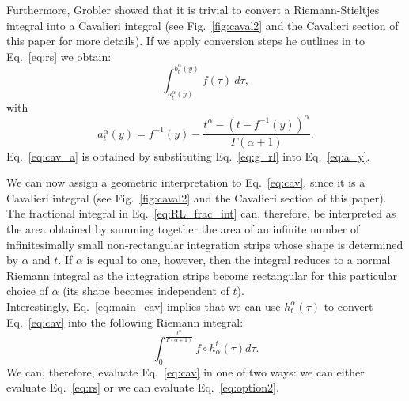 \documentclass{article}
\theoremstyle{theorem}
\theoremstyle{definition}
\begin{document}
\noindent
Furthermore, Grobler showed that it is trivial to convert a Riemann-Stieltjes integral into a Cavalieri integral \cite{ackermann12,grobler19} (see Fig.~\ref{fig:caval2} and the Cavalieri section of this paper for more details). If we apply conversion steps he outlines in \cite{grobler19} to Eq.~\eqref{eq:rs} we obtain:
\begin{equation}
\label{eq:cav}
\int_{a_t^{\alpha}(y)}^{b_t^{\alpha}(y)} f(\tau)~d\tau, 
\end{equation}
with
\begin{equation}
\label{eq:cav_a}
a_t^{\alpha}(y) = f^{-1}(y) - \frac{t^{\alpha}-(t-f^{-1}(y))^{\alpha}}{\Gamma(\alpha+1)}.
\end{equation}
Eq.~\eqref{eq:cav_a} is obtained by substituting Eq.~\eqref{eq:g_rl} into Eq.~\eqref{eq:a_y}.

\noindent
We can now assign a geometric interpretation to Eq.~\eqref{eq:cav}, since it is a Cavalieri integral (see Fig.~\ref{fig:caval2} and the Cavalieri section of this paper). The fractional integral in Eq.~\eqref{eq:RL_frac_int} can, therefore, be interpreted as the area obtained 
by summing together the area of an infinite number of infinitesimally small non-rectangular integration strips whose shape is determined by $\alpha$ and $t$. If $\alpha$ is equal to one, however, then the integral reduces to a normal Riemann integral as the integration strips become rectangular for this particular choice of $\alpha$ (its shape becomes independent of $t$).\\

\noindent
Interestingly, Eq.~\eqref{eq:main_cav} implies that we can use $h_t^{\alpha}(\tau)$ to convert Eq.~\eqref{eq:cav} into the following Riemann integral:
\begin{equation}
\label{eq:option2}
\int_0^{\frac{t^{\alpha}}{\Gamma(\alpha+1)}} f\circ h_{\alpha}^t (\tau) d\tau.  
\end{equation}
We can, therefore, evaluate Eq.~\eqref{eq:cav} in one of two ways: we can either evaluate Eq.~\eqref{eq:rs} or we can evaluate Eq.~\eqref{eq:option2}.
\end{document}
